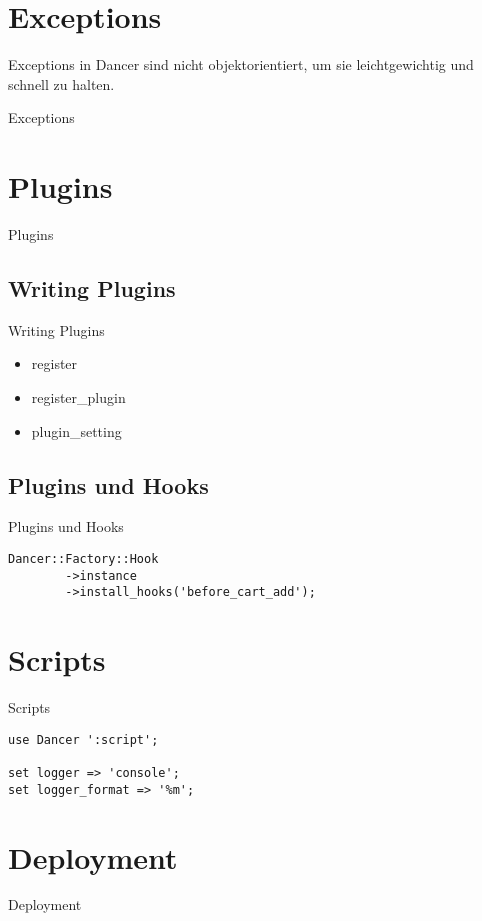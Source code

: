 \section{Exceptions}
Exceptions in Dancer sind nicht objektorientiert, um sie
leichtgewichtig und schnell zu halten.
\begin{frame}{Exceptions}
\end{frame}

\section{Plugins}
\begin{frame}{Plugins}
\end{frame}

\subsection{Writing Plugins}
\begin{frame}{Writing Plugins}
\begin{itemize}
\item register
\item register\_plugin
\item plugin\_setting
\end{itemize}
\end{frame}

\subsection{Plugins und Hooks}
\begin{frame}[fragile]{Plugins und Hooks}
\begin{lstlisting}
Dancer::Factory::Hook
        ->instance
        ->install_hooks('before_cart_add');
\end{lstlisting}
\end{frame}

\section{Scripts}
\begin{frame}[fragile]{Scripts}
\begin{lstlisting}
use Dancer ':script';

set logger => 'console';
set logger_format => '%m';
\end{lstlisting}
\end{frame}

\section{Deployment}
\begin{frame}{Deployment}
\end{frame}

